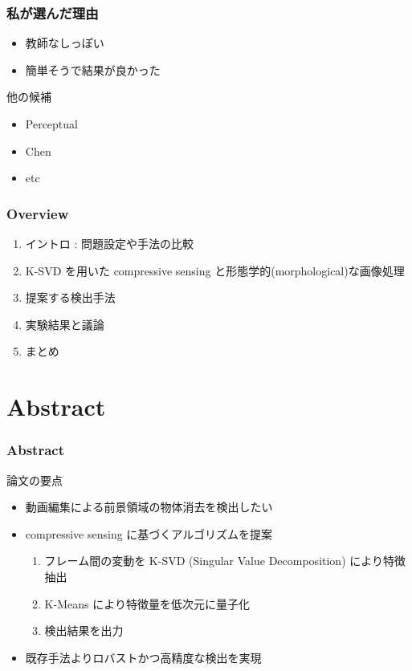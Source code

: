 \begin{frame}\frametitle{私が選んだ理由}
\begin{itemize}
    \item 教師なしっぽい
    \item 簡単そうで結果が良かった
\end{itemize}

他の候補
\begin{itemize}
    \item Perceptual ~
    \item Chen
    \item etc
\end{itemize}
\end{frame}


\begin{frame}\frametitle{Overview}
\begin{enumerate}
    \item イントロ : 問題設定や手法の比較
    \item K-SVD を用いた compressive sensing と形態学的(morphological)な画像処理
    \item 提案する検出手法
    \item 実験結果と議論
    \item まとめ
\end{enumerate}
\end{frame}

\section{Abstract}
\begin{frame}\frametitle{Abstract}
論文の要点
\begin{itemize}
    \item 動画編集による前景領域の物体消去を検出したい
    \item compressive sensing に基づくアルゴリズムを提案
    \begin{enumerate}
        \item フレーム間の変動を K-SVD (Singular Value Decomposition) により特徴抽出
        \item K-Means により特徴量を低次元に量子化
        \item 検出結果を出力
    \end{enumerate}
    \item 既存手法よりロバストかつ高精度な検出を実現
\end{itemize}
\end{frame}

